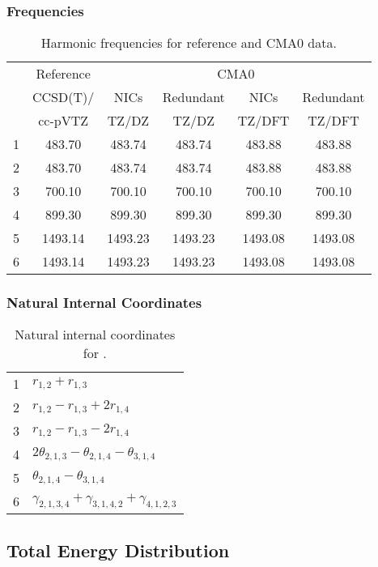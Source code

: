 \documentclass[10pt,oneside]{article}
\begin{document}
\begin{table}[h!]
\subsubsection*{Frequencies}
\centering
\caption{Harmonic frequencies for reference and CMA0 data.}
\begin{tabular}{cccccc}
\toprule
{} & Reference & \multicolumn{4}{c}{CMA0} \\
{} &  CCSD(T)/ &    NICs &  Redundant &    NICs & Redundant \\
{} &   cc-pVTZ &   TZ/DZ &      TZ/DZ &  TZ/DFT &    TZ/DFT \\
\midrule
1 &    483.70 &  483.74 &     483.74 &  483.88 &    483.88 \\
2 &    483.70 &  483.74 &     483.74 &  483.88 &    483.88 \\
3 &    700.10 &  700.10 &     700.10 &  700.10 &    700.10 \\
4 &    899.30 &  899.30 &     899.30 &  899.30 &    899.30 \\
5 &   1493.14 & 1493.23 &    1493.23 & 1493.08 &   1493.08 \\
6 &   1493.14 & 1493.23 &    1493.23 & 1493.08 &   1493.08 \\
\bottomrule
\end{tabular}
\end{table}

\begin{table}[h!]
\subsubsection*{Natural Internal Coordinates}
\centering
\caption{Natural internal coordinates for .}
\small
\begin{tabular}{ll}
\toprule
  1   & $r_{1,2} + r_{1,3}$ \\
  2   & $r_{1,2} - r_{1,3} + 2r_{1,4}$ \\
  3   & $r_{1,2} - r_{1,3} - 2r_{1,4}$ \\
  4   & $2\theta_{2,1,3} - \theta_{2,1,4} - \theta_{3,1,4}$ \\
  5   & $\theta_{2,1,4} - \theta_{3,1,4}$ \\
  6   & $\gamma_{2,1,3,4} + \gamma_{3,1,4,2} + \gamma_{4,1,2,3}$ \\
\bottomrule
\end{tabular}
\end{table}

\begin{table}
\subsection*{Total Energy Distribution}
\centering\end{table}
\end{document}
